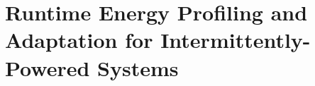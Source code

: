 \chapter{Runtime Energy Profiling and Adaptation for Intermittently-Powered Systems}

\newcommand{\nn}{\textsc{Optic}}    %
\newcommand{\debs}{\textsc{Debs}}
\newcommand{\symb}[2]{#1_{\text{#2}}}










